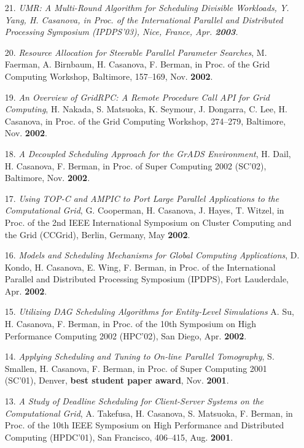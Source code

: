 \begin{enumerate}
\item [21.]
\it{UMR: A Multi-Round Algorithm for Scheduling Divisible Workloads},
Y. Yang, H. Casanova, in Proc. of the International Parallel
and Distributed Processing Symposium (IPDPS'03), Nice, France, Apr.
{\bf 2003}.

\item [20.]
{\it Resource Allocation for Steerable Parallel Parameter Searches},
M. Faerman, A. Birnbaum, H. Casanova, F. Berman, in Proc. of the
Grid Computing Workshop, Baltimore, 157--169, Nov. {\bf 2002}.

\item [19.]
{\it An Overview of GridRPC: A Remote Procedure Call API for Grid
Computing}, H. Nakada, S. Matsuoka, K. Seymour, J. Dongarra, C. Lee,
H. Casanova, in Proc. of the Grid Computing Workshop, 274--279,
Baltimore, Nov. {\bf 2002}.

\item [18.]
{\it A Decoupled Scheduling Approach for the GrADS Environment}, H. Dail,
H. Casanova, F. Berman, in Proc. of  Super Computing 2002 (SC'02),
Baltimore, Nov. {\bf 2002}.

\item[17.]
{\it Using TOP-C and AMPIC to Port Large Parallel Applications to the
Computational Grid}, G. Cooperman, H. Casanova, J. Hayes, T. Witzel, in
Proc. of the 2nd IEEE International Symposium on Cluster Computing
and the Grid (CCGrid), Berlin, Germany, May {\bf 2002}.

\item[16.]
{\it Models and Scheduling Mechanisms for Global Computing Applications},
D. Kondo, H. Casanova, E. Wing, F. Berman, in Proc. of the
International Parallel and Distributed Processing Symposium (IPDPS),
Fort Lauderdale, Apr. {\bf 2002}.

\item[15.]
{\it Utilizing DAG Scheduling Algorithms for Entity-Level Simulations}
A. Su, H. Casanova, F. Berman, in Proc. of the 10th Symposium on
High Performance Computing 2002 (HPC'02), San Diego, Apr. {\bf 2002}.

\item[14.]
{\it Applying Scheduling and Tuning to On-line Parallel Tomography},
S. Smallen, H. Casanova, F. Berman, in Proc. of Super Computing 2001
(SC'01), Denver, {\bf best student paper award}, Nov. {\bf 2001}.

\item[13.]
{\it A Study of Deadline Scheduling for Client-Server Systems on the
Computational Grid}, A. Takefusa, H. Casanova, S. Matsuoka, F. Berman, in
Proc. of the 10th IEEE Symposium on High Performance and Distributed
Computing (HPDC'01), San Francisco, 406--415, Aug. {\bf 2001}.


\end{enumerate}

